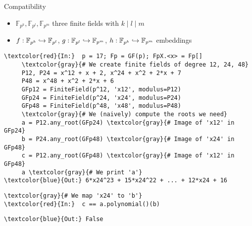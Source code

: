 \documentclass[xcolor=x11names,compress, aspectratio=43]{beamer}
\begin{document}
\begin{frame}[fragile]{Compatibility}
  \begin{itemize}
    \item $\mathbb{F}_{p^{k}}, \mathbb{F}_{p^{l}}, \mathbb{F}_{p^{m}}$ three
      finite fields with $k\mid l\mid m$
    \item $f:\mathbb{F}_{p^{k}}\hookrightarrow \mathbb{F}_{p^{l}}$,
      $g:\mathbb{F}_{p^{l}}\hookrightarrow \mathbb{F}_{p^{m}}$,
      $h:\mathbb{F}_{p^{k}}\hookrightarrow \mathbb{F}_{p^{m}}$ embeddings
\end{itemize}

\begin{minipage}{0.2\textwidth}
  \vspace{12mm}
\begin{figure}
  \centering
\end{figure}
\end{minipage}
\hspace{1mm}
\begin{minipage}{0.7\textwidth}
\begin{Verbatim}[commandchars=\\\{\}, fontsize=\scriptsize]
\textcolor{red}{In:}  p = 17; Fp = GF(p); FpX.<x> = Fp[]
     \textcolor{gray}{# We create finite fields of degree 12, 24, 48}
     P12, P24 = x^12 + x + 2, x^24 + x^2 + 2*x + 7
     P48 = x^48 + x^2 + 2*x + 6
     GFp12 = FiniteField(p^12, 'x12', modulus=P12)
     GFp24 = FiniteField(p^24, 'x24', modulus=P24)
     GFp48 = FiniteField(p^48, 'x48', modulus=P48)
     \textcolor{gray}{# We (naively) compute the roots we need}
     a = P12.any_root(GFp24) \textcolor{gray}{# Image of 'x12' in GFp24}
     b = P24.any_root(GFp48) \textcolor{gray}{# Image of 'x24' in GFp48}
     c = P12.any_root(GFp48) \textcolor{gray}{# Image of 'x12' in GFp48}
     a \textcolor{gray}{# We print 'a'} 
\textcolor{blue}{Out:} 6*x24^23 + 15*x24^22 + ... + 12*x24 + 16
  \end{Verbatim}
\pause{}
\begin{Verbatim}[commandchars=\\\{\}, fontsize=\scriptsize]
     \textcolor{gray}{# We map 'x24' to 'b'}
\textcolor{red}{In:}  c == a.polynomial()(b)
  \end{Verbatim}
\pause{}
\begin{Verbatim}[commandchars=\\\{\}, fontsize=\scriptsize]
\textcolor{blue}{Out:} False
\end{Verbatim}
\end{minipage}
\end{frame}
\end{document}
